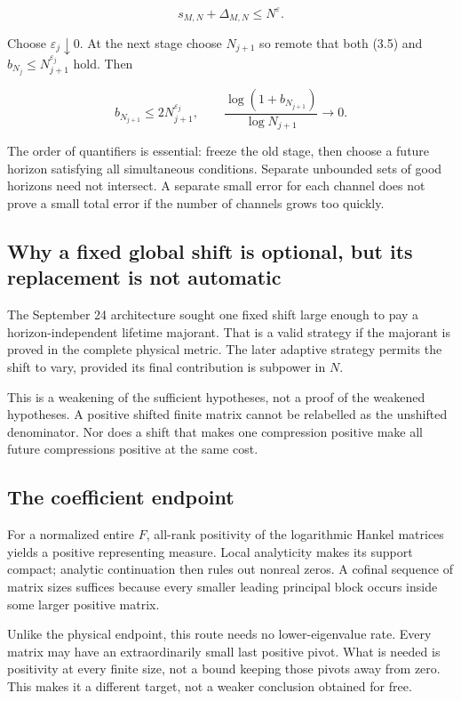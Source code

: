 \documentclass[
  10pt,
  a4paper,
  10pt,
  oneside,
  openany]{book}
\begin{document}
\[
s_{M,N}+\Delta_{M,N}\le N^\varepsilon.
\tag{3.5}\label{eq:3.5}
\]

Choose \(\varepsilon_j\downarrow0\). At the next stage choose
\(N_{j+1}\) so remote that both (3.5) and
\(b_{N_j}\le N_{j+1}^{\varepsilon_j}\) hold. Then

\[
b_{N_{j+1}}\le2N_{j+1}^{\varepsilon_j},
\qquad
\frac{\log(1+b_{N_{j+1}})}{\log N_{j+1}}\to0.
\tag{3.6}\label{eq:3.6}
\]

The order of quantifiers is essential: freeze the old stage, then choose
a future horizon satisfying all simultaneous conditions. Separate
unbounded sets of good horizons need not intersect. A separate small
error for each channel does not prove a small total error if the number
of channels grows too quickly.

\subsection{Why a fixed global shift is optional, but its replacement is
not
automatic}\label{why-a-fixed-global-shift-is-optional-but-its-replacement-is-not-automatic}

The September 24 architecture sought one fixed shift large enough to pay
a horizon-independent lifetime majorant. That is a valid strategy if the
majorant is proved in the complete physical metric. The later adaptive
strategy permits the shift to vary, provided its final contribution is
subpower in \(N\).

This is a weakening of the sufficient hypotheses, not a proof of the
weakened hypotheses. A positive shifted finite matrix cannot be
relabelled as the unshifted denominator. Nor does a shift that makes one
compression positive make all future compressions positive at the same
cost.

\subsection{The coefficient endpoint}\label{the-coefficient-endpoint}

For a normalized entire \(F\), all-rank positivity of the logarithmic
Hankel matrices yields a positive representing measure. Local
analyticity makes its support compact; analytic continuation then rules
out nonreal zeros. A cofinal sequence of matrix sizes suffices because
every smaller leading principal block occurs inside some larger positive
matrix.

Unlike the physical endpoint, this route needs no lower-eigenvalue rate.
Every matrix may have an extraordinarily small last positive pivot. What
is needed is positivity at every finite size, not a bound keeping those
pivots away from zero. This makes it a different target, not a weaker
conclusion obtained for free.
\end{document}
